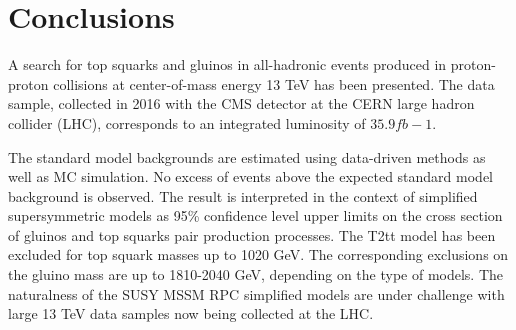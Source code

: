 \chapter{Conclusions}

A search for top squarks and gluinos in all-hadronic events produced in proton-proton collisions at center-of-mass energy 13 TeV has been presented. The data sample, collected in 2016 with the CMS detector at the CERN large hadron collider (LHC), corresponds to an integrated luminosity of $35.9 fb-1$.

The standard model backgrounds are estimated using data-driven methods as well as MC simulation. No excess of events above the expected standard model background is observed. The result is interpreted in the context of simplified supersymmetric models as 95\% confidence level upper limits on the cross section of gluinos and top squarks pair production processes. The T2tt model has been excluded for top squark masses up to 1020 GeV. The corresponding exclusions on the gluino mass are up to 1810-2040 GeV, depending on the type of models. The naturalness of the SUSY MSSM RPC simplified models are under challenge with large 13 TeV data samples now being collected at the LHC.
